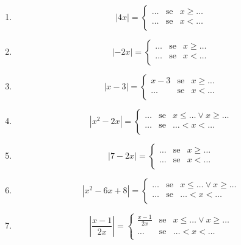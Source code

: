 \begin{enumerate}
        \item 
        $$
        |4x|=
        \left\lbrace 
        \begin{array}{lcl}
        \dots & \text{se}& x\geq\dots\\
        \dots & \text{se}& x<\dots\\
        \end{array}
        \right.
        $$
        \item 
        $$
        |-2x|=
        \left\lbrace 
        \begin{array}{lcl}
        \dots & \text{se}& x\geq\dots\\
        \dots & \text{se}& x<\dots\\
        \end{array}
        \right.
        $$
        \item 
        $$
        |x-3|=
        \left\lbrace 
        \begin{array}{lcl}
        x-3 & \text{se}& x\geq\dots\\
        \dots & \text{se}& x<\dots\\
        \end{array}
        \right.
        $$
        \item 
        $$
        |x^2-2x|=
        \left\lbrace 
        \begin{array}{lcl}
        \dots & \text{se}& x\leq\dots \vee x\geq\dots\\
        \dots & \text{se}& \dots <x<\dots\\
        \end{array}
        \right.
        $$
        \item 
        $$
        |7-2x|=
        \left\lbrace 
        \begin{array}{lcl}
        \dots & \text{se}& x\geq\dots\\
        \dots & \text{se}& x<\dots\\
        \end{array}
        \right.
        $$
        \item 
        $$
        |x^2-6x+8|=
        \left\lbrace 
        \begin{array}{lcl}
        \dots & \text{se}& x\leq\dots \vee x\geq\dots\\
        \dots & \text{se}& \dots <x<\dots\\
        \end{array}
        \right.
        $$
        \item 
        $$
        |\frac{x-1}{2x}|=
        \left\lbrace 
        \begin{array}{lcl}
        \frac{x-1}{2x} & \text{se}& x\leq\dots \vee x\geq\dots\\
        \dots & \text{se}& \dots <x<\dots\\
        \end{array}
        \right.
        $$
\end{enumerate}
